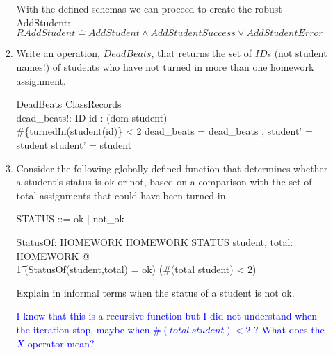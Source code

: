 \documentclass{article}
\newcommand{\estimates}{\mathrel{\hat{=}}}
\begin{document}
\begin{enumerate}
\begin{enumerate}
With the defined schemas we can proceed to create the robust AddStudent: \\
$RAddStudent \estimates AddStudent \land AddStudentSuccess \lor AddStudentError$ \\

\color{black}
\item Write an operation, $DeadBeats$, that returns the set of $ID$s
(not student names!) of students who have not turned in more than one homework assignment.
  \color{blue}
\begin{schema}{DeadBeats}
  \Xi ClassRecords \\
  dead\_beats!:  ID
  \where
  \forall id : (dom student) \bullet \\
     \#\{turnedIn(student(id)\} < 2 \land dead\_beats = dead\_beats , student' = student \land student' = student 
\end{schema}
\color{black}

\item Consider the following globally-defined function that
determines whether a student's status is ok or not, based on a
comparison with the set of total assignments that could have been
turned in.

\begin{zed}
    STATUS ::= ok | not\_ok
\end{zed}

\begin{axdef}
    StatusOf: \power HOMEWORK \cross \power HOMEWORK \fun STATUS
\where
    \forall student, total: \power HOMEWORK @ \\
\t1    (StatusOf(student,total) = ok) \iff (\#(total \setminus
student) < 2)
\end{axdef}

Explain in informal terms when the status of a student is not ok.

\textcolor{blue}{
  I know that this is a recursive function but I did not understand when the
  iteration stop, maybe when $\#(total \ student ) < 2$ ?
  What does the $X$ operator mean? 
}

\end{enumerate}


\end{enumerate}
\end{document}
